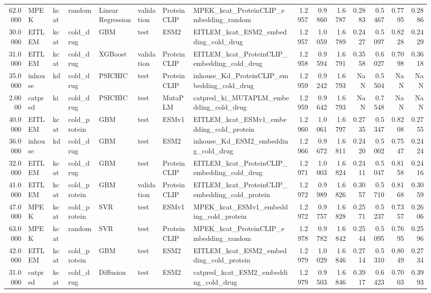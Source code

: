 \begin{tabular}{rlllllllrrrrrrr}
62.0000 & MPEK & kcat & random & Linear Regression & validation & ProteinCLIP & MPEK_kcat_ProteinCLIP_embedding_random & 1.2957 & 0.9860 & 1.6787 & 0.2883 & 0.5467 & 0.7795 & 0.2886 \\
30.0000 & EITLEM & kcat & cold_drug & GBM & test & ESM2 & EITLEM_kcat_ESM2_embedding_cold_drug & 1.2957 & 1.0059 & 1.6789 & 0.2427 & 0.5097 & 0.8228 & 0.2429 \\
31.0000 & EITLEM & kcat & cold_drug & XGBoost & validation & ProteinCLIP & EITLEM_kcat_ProteinCLIP_embedding_cold_drug & 1.2958 & 0.9594 & 1.6791 & 0.3558 & 0.6027 & 0.7098 & 0.3618 \\
35.0000 & inhouse & kd & cold_drug & PSICHIC & test & ProteinCLIP & inhouse_Kd_ProteinCLIP_embedding_cold_drug & 1.2959 & 0.9242 & 1.6793 & NaN & 0.5504 & NaN & NaN \\
2.0000 & catpred & ki & cold_drug & PSICHIC & test & MutaPLM & catpred_ki_MUTAPLM_embedding_cold_drug & 1.2959 & 0.9642 & 1.6793 & NaN & 0.7548 & NaN & NaN \\
40.0000 & EITLEM & kcat & cold_protein & GBM & test & ESMv1 & EITLEM_kcat_ESMv1_embedding_cold_protein & 1.2960 & 1.0061 & 1.6797 & 0.2735 & 0.5347 & 0.8208 & 0.2755 \\
36.0000 & inhouse & kd & cold_drug & GBM & test & ESM2 & inhouse_Kd_ESM2_embedding_cold_drug & 1.2966 & 0.9672 & 1.6811 & 0.2420 & 0.5002 & 0.7547 & 0.2424 \\
32.0000 & EITLEM & kcat & cold_drug & GBM & test & ProteinCLIP & EITLEM_kcat_ProteinCLIP_embedding_cold_drug & 1.2971 & 1.0003 & 1.6824 & 0.2411 & 0.5047 & 0.8158 & 0.2416 \\
41.0000 & EITLEM & kcat & cold_protein & GBM & validation & ProteinCLIP & EITLEM_kcat_ProteinCLIP_embedding_cold_protein & 1.2972 & 0.9989 & 1.6826 & 0.3057 & 0.5710 & 0.8168 & 0.3059 \\
47.0000 & MPEK & kcat & cold_protein & SVR & test & ESMv1 & MPEK_kcat_ESMv1_embedding_cold_protein & 1.2972 & 0.9757 & 1.6828 & 0.2571 & 0.5237 & 0.7357 & 0.2606 \\
63.0000 & MPEK & kcat & random & SVR & test & ProteinCLIP & MPEK_kcat_ProteinCLIP_embedding_random & 1.2978 & 0.9782 & 1.6842 & 0.2544 & 0.5095 & 0.7695 & 0.2596 \\
42.0000 & EITLEM & kcat & cold_protein & GBM & test & ESM2 & EITLEM_kcat_ESM2_embedding_cold_protein & 1.2979 & 1.0029 & 1.6846 & 0.2714 & 0.5310 & 0.8049 & 0.2734 \\
31.0000 & catpred & kcat & cold_drug & Diffusion & test & ESM2 & catpred_kcat_ESM2_embedding_cold_drug & 1.2979 & 0.9503 & 1.6846 & 0.3917 & 0.6423 & 0.7003 & 0.3993 \\

\end{tabular}
